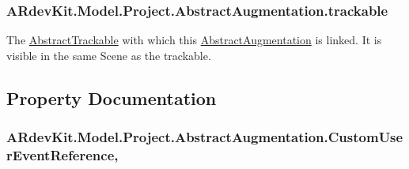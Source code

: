 \hypertarget{class_a_rdev_kit_1_1_model_1_1_project_1_1_abstract_augmentation_a8d8e3f3c42696008edbfc44d51ba518d}{
\subsubsection[{trackable}]{ A\-Rdev\-Kit.\-Model.\-Project.\-Abstract\-Augmentation.\-trackable\hspace{0.3cm}{\ttfamily [protected]}}}\label{class_a_rdev_kit_1_1_model_1_1_project_1_1_abstract_augmentation_a8d8e3f3c42696008edbfc44d51ba518d}


The \hyperlink{class_a_rdev_kit_1_1_model_1_1_project_1_1_abstract_trackable}{Abstract\-Trackable} with which this \hyperlink{class_a_rdev_kit_1_1_model_1_1_project_1_1_abstract_augmentation}{Abstract\-Augmentation} is linked. It is visible in the same Scene as the trackable. 



\subsection{Property Documentation}
\hypertarget{class_a_rdev_kit_1_1_model_1_1_project_1_1_abstract_augmentation_a333186e3963596bc5b17c02a21f2d384}{
\subsubsection[{Custom\-User\-Event\-Reference}]{ A\-Rdev\-Kit.\-Model.\-Project.\-Abstract\-Augmentation.\-Custom\-User\-Event\-Reference\hspace{0.3cm}{\ttfamily [get]}, {\ttfamily [set]}}}\label{class_a_rdev_kit_1_1_model_1_1_project_1_1_abstract_augmentation_a333186e3963596bc5b17c02a21f2d384}


